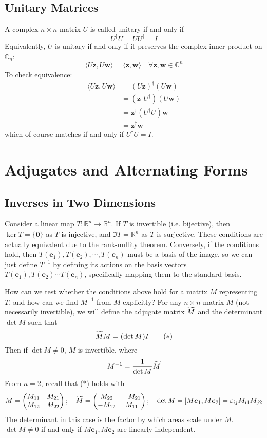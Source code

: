 \documentclass{article}
\begin{document}
\subsection{Unitary Matrices}
A complex $n \times n$ matrix $U$ is called unitary if and only if
\[ U^\dagger U = U U^\dagger = I \]
Equivalently, $U$ is unitary if and only if it preserves the complex inner product on $\mathbb C_n$:
\[ \langle U \bm z, U \bm w \rangle = \langle \bm z, \bm w \rangle\quad \forall \bm z, \bm w \in \mathbb C^n \]
To check equivalence:
\begin{align*}
	\langle U \bm z, U \bm w \rangle & = (U \bm z)^\dagger (U \bm w)         \\
	                                 & = (\bm z^\dagger U^\dagger) (U \bm w) \\
	                                 & = \bm z^\dagger (U^\dagger U) \bm w   \\
	                                 & = \bm z^\dagger \bm w
\end{align*}
which of course matches if and only if $U^\dagger U = I$.

\section{Adjugates and Alternating Forms}
\subsection{Inverses in Two Dimensions}
Consider a linear map $T\colon \mathbb R^n \to \mathbb R^n$. If $T$ is invertible (i.e. bijective), then $\ker T = \{ \bm 0 \}$ as $T$ is injective, and $\Im T = \mathbb R^n$ as $T$ is surjective. These conditions are actually equivalent due to the rank-nullity theorem. Conversely, if the conditions hold, then $T(\bm e_1), T(\bm e_2), \cdots, T(\bm e_n)$ must be a basis of the image, so we can just define $T^{-1}$ by defining its actions on the basis vectors $T(\bm e_1), T(\bm e_2) \cdots T(\bm e_n)$, specifically mapping them to the standard basis.

How can we test whether the conditions above hold for a matrix $M$ representing $T$, and how can we find $M^{-1}$ from $M$ explicitly? For any $n \times n$ matrix $M$ (not necessarily invertible), we will define the adjugate matrix $\widetilde{M}$ and the determinant $\det M$ such that
\[ \widetilde{M} M = (\det M) I \tag{$\ast$} \]
Then if $\det M \neq 0$, $M$ is invertible, where
\[ M^{-1} = \frac{1}{\det M}\widetilde{M} \]
From $n=2$, recall that ($\ast$) holds with
\[ M = \begin{pmatrix}
		M_{11} & M_{21} \\
		M_{12} & M_{22}
	\end{pmatrix};\quad \widetilde{M} = \begin{pmatrix}
		M_{22}  & -M_{21} \\
		-M_{12} & M_{11}
	\end{pmatrix};\quad \det M = [M\bm e_1, M\bm e_2] = \varepsilon_{ij}M_{i1}M_{j2} \]
The determinant in this case is the factor by which areas scale under $M$. $\det M \neq 0$ if and only if $M\bm e_1, M\bm e_2$ are linearly independent.
\end{document}
